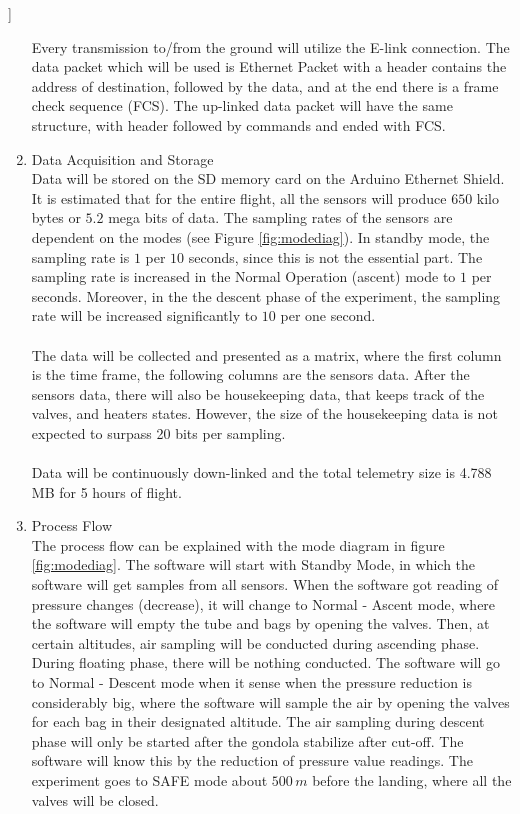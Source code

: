 ]\documentclass[a4paper,12pt,twoside]{article}
\begin{document}
\begin{enumerate}[label=(\alph*)]
Every transmission to/from the ground will utilize the E-link connection. The data packet which will be used is Ethernet Packet with a header contains the address of destination, followed by the data, and at the end there is a frame check sequence (FCS). The up-linked data packet will have the same structure, with header followed by commands and ended with FCS.
\item{Data Acquisition and Storage}\\
Data will be stored on the SD memory card on the Arduino Ethernet Shield. It is estimated that for the entire flight, all the sensors will produce $650$ kilo bytes or $5.2$ mega bits of data. The sampling rates of the sensors are dependent on the modes (see Figure \ref{fig:modediag}). In standby mode, the sampling rate is $1$ per $10$ seconds, since this is not the essential part. The sampling rate is increased in the Normal Operation (ascent) mode to $1$ per seconds. Moreover, in the the descent phase of the experiment, the sampling rate will be increased significantly to $10$ per one second.\\
\\
The data will be collected and presented as a matrix, where the first column is the time frame, the following columns are the sensors data. After the sensors data, there will also be housekeeping data, that keeps track of the valves, and heaters states. However, the size of the housekeeping data is not expected to surpass 20 bits per sampling.\\
\\
Data will be continuously down-linked and the total telemetry size is 4.788 MB for 5 hours of flight.
\item{Process Flow}\\
The process flow can be explained with the mode diagram in figure \ref{fig:modediag}. The software will start with Standby Mode, in which the software will get samples from all sensors. When the software got reading of pressure changes (decrease), it will change to Normal - Ascent mode, where the software will empty the tube and bags by opening the valves. Then, at certain altitudes, air sampling will be conducted during ascending phase. During floating phase, there will be nothing conducted. The software will go to Normal - Descent mode when it sense when the pressure reduction is considerably big, where the software will sample the air by opening the valves for each bag in their designated altitude. The air sampling during descent phase will only be started after the gondola stabilize after cut-off. The software will know this by the reduction of pressure value readings. The experiment goes to SAFE mode about $500 \, m$ before the landing, where all the valves will be closed. 

\end{enumerate}
\end{document}
